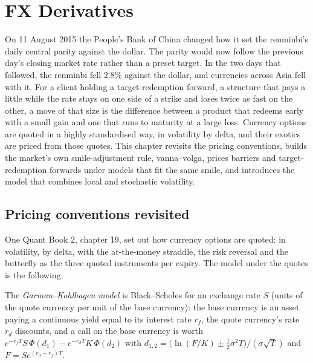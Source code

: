 \chapter{FX Derivatives}\label{ch:dv:fx-derivatives}

On 11 August 2015 the People's Bank of China changed how it set the renminbi's daily central parity against the dollar.
The parity would now follow the previous day's closing market rate rather than a preset target. In the two days that
followed, the renminbi fell 2.8\% against the dollar, and currencies across Asia fell with it. For a client holding a
target-redemption forward, a structure that pays a little while the rate stays on one side of a strike and loses twice as
fast on the other, a move of that size is the difference between a product that redeems early with a small gain and one
that runs to maturity at a large loss. Currency options are quoted in a highly standardised way, in volatility by delta, and their exotics are
priced from those quotes. This chapter revisits the pricing conventions, builds the
market's own smile-adjustment rule, vanna--volga, prices barriers and target-redemption forwards under models that fit the
same smile, and introduces the model that combines local and stochastic volatility.

\section{Pricing conventions revisited}

One Quant Book 2, chapter 19, set out how currency options are quoted: in volatility, by delta, with the at-the-money
straddle, the risk reversal and the butterfly as the three quoted instruments per expiry. The model under the quotes is the
following.

\begin{definition}\label{def:dv:fx-derivatives:gk}
The \emph{Garman--Kohlhagen model} is Black--Scholes for an exchange rate $S$ (units of the quote
currency per unit of the base currency): the base currency is an asset paying a continuous yield equal to its interest rate $r_f$,
the quote currency's rate $r_d$ discounts, and a call on the base currency is worth
$e^{-r_fT}S\,\Phi(d_1)-e^{-r_dT}K\,\Phi(d_2)$ with $d_{1,2}=\bigl(\ln(F/K)\pm\frac12\sigma^2T\bigr)/(\sigma\sqrt T)$ and
$F=Se^{(r_d-r_f)T}$.
\end{definition}

